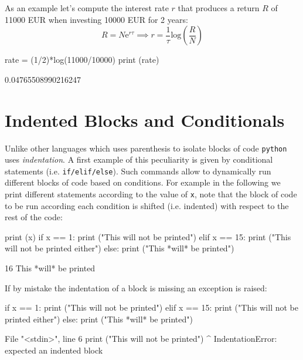 As an example let's compute the interest rate $r$ that produces a return $R$ of 11000 EUR when investing 10000 EUR for 2 years:
\begin{equation*}
R = N\mathrm{e}^{r\tau} \implies r = \frac{1}{\tau} \mathrm{log}(\frac{R}{N})
\end{equation*}

\begin{ipython}
rate = (1/2)*log(11000/10000)
print (rate)
\end{ipython}
\begin{ioutput}
0.04765508990216247	
\end{ioutput}

\section{Indented Blocks and Conditionals}
\label{indented-blocks-and-the-ttifelse-statement}

Unlike other languages which uses parenthesis to isolate blocks of code \texttt{python} uses \emph{indentation}. A first example of this peculiarity is given by conditional statements (i.e. \texttt{if/elif/else}). Such commands allow to dynamically run different blocks of code based on conditions. For example in the following we print different statements according to the value of \texttt{x}, note that the block of code to be run according each condition is shifted (i.e. indented) with respect to the rest of the code:

\begin{ipython}
print (x)
if x == 1:
	print ("This will not be printed")
elif x == 15:
	print ("This will not be printed either")
else:
	print ("This *will* be printed")
\end{ipython}
\begin{ioutput}
16
This *will* be printed	
\end{ioutput}

If by mistake the indentation of a block is missing an exception is raised:

\begin{ipython}
if x == 1:
    print ("This will not be printed")
elif x == 15:
    print ("This will not be printed either")
else:
   print ("This *will* be printed")
\end{ipython}
\begin{ioutput}
  File "<stdin>", line 6
    print ("This will not be printed")
        ^
IndentationError: expected an indented block
\end{ioutput}

